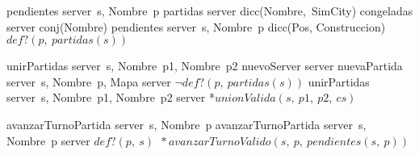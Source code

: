 \begin{tad}{}
    
\vspace{3mm}
    \tadObservadores
        \tadAlinearFunciones
            {pendientes}
            {server\ s, Nombre\ p}
        \tadOperacion
            {partidas}
            {server}
            {dicc(Nombre,\ SimCity)}
            {}
        \tadOperacion
            {congeladas}
            {server}
            {conj(Nombre)}
            {}
        \tadOperacion
            {pendientes}
            {server\ s, Nombre\ p}
            {dicc(Pos, Construccion)}
            {$def?(p,\ partidas(s))$}
            
\vspace{3mm}
    \tadGeneradores
    \tadAlinearFunciones
    {unirPartidas}
    {server\ s, Nombre\ p1, Nombre\ p2}
        \tadOperacion
            {nuevoServer}
            {}
            {server}
            {}
        \tadOperacion
            {nuevaPartida}
            {server\ s, Nombre\ p, Mapa}
            {server}
            {$\neg def?(p,\ partidas(s))$}
        \tadOperacion
            {unirPartidas}
            {server\ s, Nombre\ p1, Nombre\ p2}
            {server}
            {*$unionValida(s,\ p1,\ p2,\ cs)$}

    \tadAlinearFunciones
    {avanzarTurnoPartida}
    {server\ s, Nombre\ p}
        \tadOperacion
            {avanzarTurnoPartida}
            {server\ s, Nombre\ p}
            {server}
            {$def?(p,\ s)\ $\yluego$\ *avanzarTurnoValido(s,\ p,\ pendientes(s,\ p))$} 


\end{tad}
